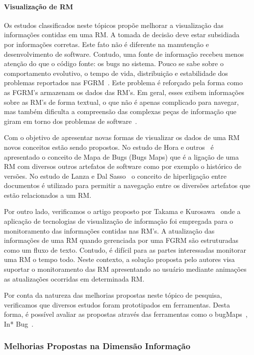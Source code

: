 \paragraph{Visualização de RM} Os estudos classificados neste tópicos propõe
melhorar a visualização das informações contidas em uma RM\@. A tomada de
decisão deve estar subsidiada por informações corretas. Este fato não é
diferente na manutenção e desenvolvimento de software. Contudo, uma fonte de
informação recebeu menos atenção do que o código fonte: os bugs no sistema.
Pouco se sabe sobre o comportamento evolutivo, o tempo de vida, distribuição e
estabilidade dos problemas reportados nas FGRM~\cite{hora2012bug}. Este problema
é reforçado pela forma como as FGRM's armazenam os dados das RM's. Em geral,
esses exibem informações sobre as RM's de forma textual, o que não é apenas
complicado para navegar, mas também dificulta a compreensão das complexas peças
de informação que giram em torno dos problemas de software~\cite{dal2014bug}.

Com o objetivo de apresentar novas formas de visualizar os dados de uma RM novos
conceitos estão sendo propostos. No estudo de Hora e outros~\cite{hora2012bug} é
apresentado o conceito de Mapa de Bugs (Bugs Maps) que é a ligação de uma RM com
diversos outros artefatos de software como por exemplo o histórico de versões.
No estudo de Lanza e  Dal Sasso~\cite{dal2014bug} o conceito de hiperligação
entre documentos é utilizado para permitir a navegação entre os diversões
artefatos que estão relacionados a um RM\@.

Por outro lado, verificamos o artigo proposto por Takama e
Kurosawa~\cite{takama2013application} onde a aplicação de tecnologias de
visualização de informação foi empregada para o monitoramento das informações
contidas nas RM's. A atualização das informações de uma RM quando gerenciada por
uma FGRM são estruturadas como um fluxo de texto. Contudo, é difícil para as
partes interessadas monitorar uma RM o tempo todo. Neste contexto, a solução
proposta pelo autores visa suportar o monitoramento das RM apresentando ao
usuário mediante animações as atualizações ocorridas em determinada RM\@.

Por conta da natureza das melhorias propostas neste tópico de pesquisa,
verificamos que diversos estudos foram prototipados em ferramentas. Desta forma,
é possível avaliar as propostas através das ferramentas como o
bugMaps~\cite{hora2012bug}, In* Bug~\cite{dal2014bug}.

\subsubsection{Melhorias Propostas na Dimensão Informação}
\label{ssub:melhorias_dim_informacao}

